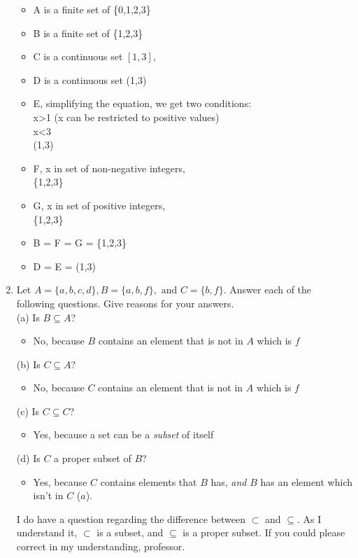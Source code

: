 \documentclass[english,12pt,legalpaper]{article}
\begin{document}
\begin{enumerate}
	\begin{itemize}
		\item A is a finite set of \{0,1,2,3\}
		\item B is a finite set of \{1,2,3\}
		\item C is a continuous set $[1,3]$, 
		\item D is a continuous set (1,3)
		\item E, simplifying the equation, we get two conditions:
		\\ x>1 (x can be restricted to positive values)
		\\ x<3
		\\ (1,3)
		\item F, x in set of non-negative integers,
		\\ \{1,2,3\}
		\item G, x in set of positive integers, 
		\\ \{1,2,3\}
		\\
		\item  B = F = G = \{1,2,3\} 
		\item D = E = (1,3)
	\end{itemize}
	
	
	\item Let $A = \{a, b, c, d\}, B = \{a, b, f \}, \text{ and } C = \{b, f\}.$ Answer each of the following questions. Give reasons for your answers. \\
	(a) Is $B \subseteq A$? 
	\begin{itemize}
		\item No, because $B$ contains an element that is not in $A$ which is $f$
	\end{itemize}
	(b) Is $C \subseteq A$?  
	\begin{itemize}
		\item No, because $C$ contains an element that is not in $A$ which is $f$
	\end{itemize}
	(c) Is $C \subseteq C$?
		\begin{itemize}
			\item Yes, because a set can be a \textit{subset} of itself 
		\end{itemize}
	(d) Is $C$ a proper subset of $B$?
	
	\begin{itemize}
		\item Yes, because $C$ contains  elements that $B$ has, \textit{and} $B$ has an element which isn't in $C$ ($a$).
	\end{itemize}
	\begin{flushright}
	  I do have a question regarding the difference between $\subset$ and $\subseteq$. As I understand it, $\subset$ is a subset, and $\subseteq$ is a proper subset. If you could please correct in my understanding, professor. \\	
	\end{flushright}
	

\end{enumerate}
\end{document}
